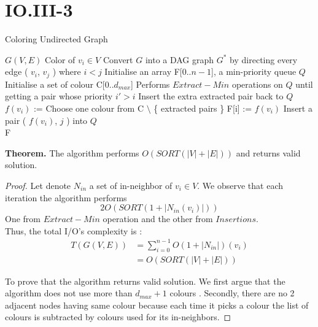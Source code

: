 \section*{IO.III-3}

\begin{algorithm}
  \caption{Coloring Undirected Graph}
  \label{alg:global_minimum}
  \begin{algorithmic}
    \renewcommand{\algorithmicrequire}{\textbf{Input:}}
    \renewcommand{\algorithmicensure}{\textbf{Output:}}
    \algnewcommand{}
    \algnewcommand\Operation{\item[\algorithmicoperation]}
    \Require $G( V, E )$
    \Ensure Color of $v_i \in V$
    \Operation
    \State Convert $G$ into a DAG graph $G^*$ by directing every edge ( $v_i$, $v_j$ ) where $i < j$
    \State Initialise an array F[0..$n-1$], a min-priority queue $Q$
    \State Initialise a set of colour C[0..$d_{max}$]
    	\State Performs $Extract-Min$ operations on $Q$ until getting a pair whose priority $i' > i$
	\State Insert the extra extracted pair back to $Q$
	\State $f(v_i)$ := Choose one colour from C $\setminus$ \{ extracted pairs \}
	\State F[i] := $f(v_i)$
	        \State Insert a pair ( $f(v_i)$, $j$ ) into $Q$
	   \EndFor
    \EndFor \\
    \Return F
  \end{algorithmic}
\end{algorithm}
\textbf{Theorem.} The algorithm performs $O( SORT(|V|+|E|) )$ and returns valid solution.

\begin{proof}
    Let denote $N_{in}$ a set of in-neighbor of $v_i \in V$. We observe that each iteration the algorithm performs
    $$2O( SORT(1 + |N_{in}(v_i)| ))$$
One from $Extract-Min$ operation and the other from $Insertions$. \\
Thus, the total I/O's complexity  is :
\begin{align*}
    T(G(V,E)) &= \sum^{n-1}_{i=0}{O( 1 + |N_{in}|)(v_i)} \\
    &= O( SORT( |V|+|E| ))
\end{align*}

To prove that the algorithm returns valid solution. We first argue that the algorithm does not use more than $d_{max} + 1 $ colours .
Secondly, there are no 2 adjacent nodes having same colour because each time it picks a colour the list of colours is subtracted by colours used for its in-neighbors.

\end{proof}

